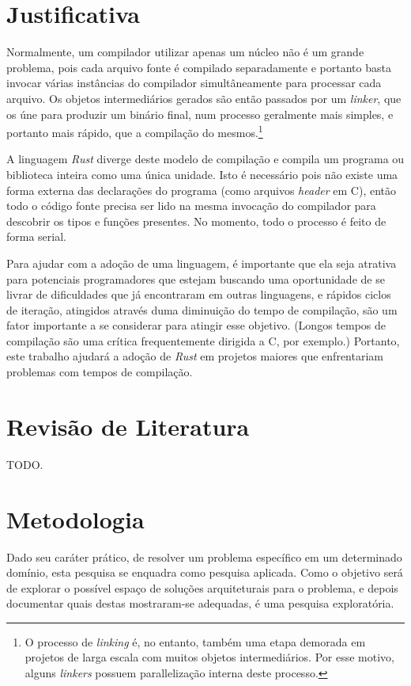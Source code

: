 \documentclass[12pt]{article}
\def\Cpp{{C\nolinebreak[4]\hspace{-.05em}\raisebox{.4ex}{\tiny\bf ++}}}
\newcommand{\todo}[1]{\textsf{\color{red}#1}}
\begin{document}
\section{Justificativa}

Normalmente, um compilador utilizar apenas um núcleo não é um grande problema, pois cada arquivo fonte é compilado separadamente e portanto basta invocar várias instâncias do compilador simultâneamente para processar cada arquivo. Os objetos intermediários gerados são então passados por um \emph{linker}, que os úne para produzir um binário final, num processo geralmente mais simples, e portanto mais rápido, que a compilação do mesmos.\footnote{O processo de \emph{linking} é, no entanto, também uma etapa demorada em projetos de larga escala com muitos objetos intermediários. Por esse motivo, alguns \emph{linkers} possuem parallelização interna deste processo.}

A linguagem \emph{Rust} diverge deste modelo de compilação e compila um programa ou biblioteca inteira como uma única unidade. Isto é necessário pois não existe uma forma externa das declarações do programa (como arquivos \emph{header} em C), então todo o código fonte precisa ser lido na mesma invocação do compilador para descobrir os tipos e funções presentes. No momento, todo o processo é feito de forma serial.

Para ajudar com a adoção de uma linguagem, é importante que ela seja atrativa para potenciais programadores que estejam buscando uma oportunidade de se livrar de dificuldades que já encontraram em outras linguagens, e rápidos ciclos de iteração, atingidos através duma diminuição do tempo de compilação, são um fator importante a se considerar para atingir esse objetivo. (Longos tempos de compilação são uma crítica frequentemente dirigida a \Cpp, por exemplo.) Portanto, este trabalho ajudará a adoção de \emph{Rust} em projetos maiores que enfrentariam problemas com tempos de compilação.

\section{Revisão de Literatura}

\todo{TODO.}

\section{Metodologia}

Dado seu caráter prático, de resolver um problema específico em um determinado domínio, esta pesquisa se enquadra como pesquisa aplicada. Como o objetivo será de explorar o possível espaço de soluções arquiteturais para o problema, e depois documentar quais destas mostraram-se adequadas, é uma pesquisa exploratória.
\end{document}
